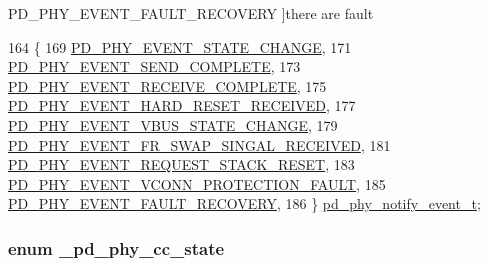 \begin{Desc}
\begin{description}
{\hypertarget{group__usb__pd__phy__drv_gga9e1e6534f05a5dfae46d27dbf43e0455a2908542d9124ac2605f062654f8be797}{P\-D\-\_\-\-P\-H\-Y\-\_\-\-E\-V\-E\-N\-T\-\_\-\-F\-A\-U\-L\-T\-\_\-\-R\-E\-C\-O\-V\-E\-R\-Y}\label{group__usb__pd__phy__drv_gga9e1e6534f05a5dfae46d27dbf43e0455a2908542d9124ac2605f062654f8be797}
}]there are fault \end{description}
\end{Desc}

\begin{DoxyCode}
164 \{
169     \hyperlink{group__usb__pd__phy__drv_gga9e1e6534f05a5dfae46d27dbf43e0455a1c7d2386b854afa09864304c2c407b04}{PD\_PHY\_EVENT\_STATE\_CHANGE},
171     \hyperlink{group__usb__pd__phy__drv_gga9e1e6534f05a5dfae46d27dbf43e0455ad761e5459c646a3557ddd40db0860251}{PD\_PHY\_EVENT\_SEND\_COMPLETE},
173     \hyperlink{group__usb__pd__phy__drv_gga9e1e6534f05a5dfae46d27dbf43e0455a75755590b2a119a4a558e7b13a708bd4}{PD\_PHY\_EVENT\_RECEIVE\_COMPLETE},
175     \hyperlink{group__usb__pd__phy__drv_gga9e1e6534f05a5dfae46d27dbf43e0455a7e6b6e7834c0ee9d4b6a990f5f92b2ba}{PD\_PHY\_EVENT\_HARD\_RESET\_RECEIVED},
177     \hyperlink{group__usb__pd__phy__drv_gga9e1e6534f05a5dfae46d27dbf43e0455a906bb6506d930fb23604d0343678ac63}{PD\_PHY\_EVENT\_VBUS\_STATE\_CHANGE},
179     \hyperlink{group__usb__pd__phy__drv_gga9e1e6534f05a5dfae46d27dbf43e0455a275e7486f8964603c2affb44cd08fc35}{PD\_PHY\_EVENT\_FR\_SWAP\_SINGAL\_RECEIVED},
181     \hyperlink{group__usb__pd__phy__drv_gga9e1e6534f05a5dfae46d27dbf43e0455ae64660dbae463fdd2b0bcf3aa85b35c8}{PD\_PHY\_EVENT\_REQUEST\_STACK\_RESET},
183     \hyperlink{group__usb__pd__phy__drv_gga9e1e6534f05a5dfae46d27dbf43e0455aae1ef925e985664558cd2fc67e52bdc5}{PD\_PHY\_EVENT\_VCONN\_PROTECTION\_FAULT},
185     \hyperlink{group__usb__pd__phy__drv_gga9e1e6534f05a5dfae46d27dbf43e0455a2908542d9124ac2605f062654f8be797}{PD\_PHY\_EVENT\_FAULT\_RECOVERY},
186 \} \hyperlink{group__usb__pd__phy__drv_ga08a2ea1727987dec255c30cdea6396fa}{pd\_phy\_notify\_event\_t};
\end{DoxyCode}
\hypertarget{group__usb__pd__phy__drv_ga09172da56b484f99a2ee891e75882faa}{
\subsubsection[{\-\_\-pd\-\_\-phy\-\_\-cc\-\_\-state}]{\setlength{\rightskip}{0pt plus 5cm}enum {\bf \-\_\-pd\-\_\-phy\-\_\-cc\-\_\-state}}}\label{group__usb__pd__phy__drv_ga09172da56b484f99a2ee891e75882faa}


